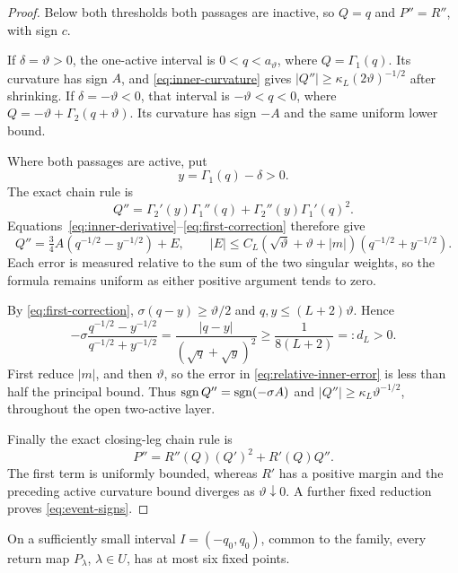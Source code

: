 \begin{proof}
Below both thresholds both passages are inactive, so \(Q=q\) and
\(P''=R''\), with sign \(c\).

If \(\delta=\vartheta>0\), the one-active interval is \(0<q<a_\vartheta\), where
\(Q=\Gamma_1(q)\). Its curvature has sign \(A\), and
\eqref{eq:inner-curvature} gives
\(|Q''|\ge\kappa_L(2\vartheta)^{-1/2}\) after shrinking.
If \(\delta=-\vartheta<0\), that interval is \(-\vartheta<q<0\), where
\(Q=-\vartheta+\Gamma_2(q+\vartheta)\). Its curvature has sign \(-A\) and the same
uniform lower bound.

Where both passages are active, put
\[
 y=\Gamma_1(q)-\delta>0.
\]
The exact chain rule is
\[
 Q''=\Gamma_2'(y)\Gamma_1''(q)
          +\Gamma_2''(y)\Gamma_1'(q)^2.
\]
Equations~\eqref{eq:inner-derivative}--\eqref{eq:first-correction}
therefore give
\begin{equation}\label{eq:relative-inner-error}
 Q''=\tfrac34 A(q^{-1/2}-y^{-1/2})+E,\qquad
 |E|\le C_L(\sqrt \vartheta+\vartheta+|m|)
                 (q^{-1/2}+y^{-1/2}).
\end{equation}
Each error is measured relative to the sum of the two singular
weights, so the formula remains uniform as either positive argument tends
to zero.

By \eqref{eq:first-correction},
\(\sigma(q-y)\ge \vartheta/2\) and \(q,y\le(L+2)\vartheta\). Hence
\[
 -\sigma\frac{q^{-1/2}-y^{-1/2}}{q^{-1/2}+y^{-1/2}}
 =\frac{|q-y|}{(\sqrt q+\sqrt y)^2}
 \ge\frac1{8(L+2)}=:d_L>0.
\]
First reduce \(|m|\), and then \(\vartheta\), so the error in
\eqref{eq:relative-inner-error} is less than half the principal bound.
Thus \(\operatorname{sgn} Q''=\operatorname{sgn}(-\sigma A)\) and
\(|Q''|\ge\kappa_L\vartheta^{-1/2}\), throughout the open two-active layer.

Finally the exact closing-leg chain rule is
\[
 P''=R''(Q)(Q')^2+R'(Q)Q''.
\]
The first term is uniformly bounded, whereas \(R'\) has a positive
margin and the preceding active curvature bound diverges as
\(\vartheta\downarrow0\). A further fixed reduction proves
\eqref{eq:event-signs}.
\end{proof}

\begin{proposition}\label{prop:common-count}
On a sufficiently small interval $I=(-q_0,q_0)$, common to the family, every
return map $P_\lambda$, $\lambda\in U$, has at most six fixed points.
\end{proposition}

